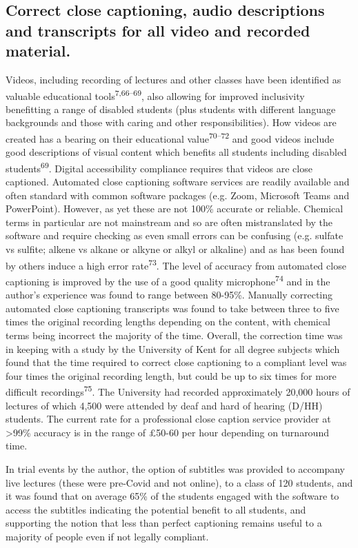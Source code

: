 \documentclass[11.5pt]{sig-alternate} %
\begin{document}
\begin{large}
\subsection*{Correct close captioning, audio descriptions and transcripts for all video and recorded material.}
Videos, including recording of lectures and other classes have been identified as valuable educational tools\textsuperscript{7,66–69}, also allowing  for improved  inclusivity benefitting a range of disabled students (plus students with different language backgrounds and those with caring and other responsibilities). How videos are created has a bearing on their educational value\textsuperscript{70–72} and good videos include good descriptions of visual content which benefits all students including disabled students\textsuperscript{69}. Digital accessibility compliance requires that videos are close captioned. Automated close captioning software services are readily available and often standard with common software packages (e.g. Zoom, Microsoft Teams and PowerPoint).  However, as yet these are not 100\% accurate or reliable. Chemical terms in particular are not mainstream and so are often mistranslated by the software and require checking as even small errors can be confusing (e.g. sulfate vs sulfite; alkene vs alkane or alkyne or alkyl or alkaline) and as has been found by others induce a high error rate\textsuperscript{73}. The level of accuracy from automated close captioning is improved by the use of a good quality microphone\textsuperscript{74} and in the author’s experience was found to range between 80-95\%. Manually correcting automated close captioning transcripts was found to take between three to five times the original recording lengths depending on the content, with chemical terms being incorrect the majority of the time. Overall, the correction time was in keeping with a study by the University of Kent for all degree subjects which found that the time required to correct close captioning to a compliant level was four times the original recording length, but could be up to six times for more difficult recordings\textsuperscript{75}. The University had recorded approximately 20,000 hours of lectures of which 4,500 were attended by deaf and hard of hearing (D/HH) students. The current rate for a professional close caption service provider at >99\% accuracy is in the range of £50-60 per hour depending on turnaround time. 

In trial events by the author, the option of subtitles was provided to accompany live lectures (these were pre-Covid and not online), to a class of 120 students, and it was found that on average 65\% of the students engaged with the software to access the subtitles indicating the potential benefit to all students, and supporting the notion that less than perfect captioning remains useful to a majority of people even if not legally compliant. 


\end{large}
\end{document}
